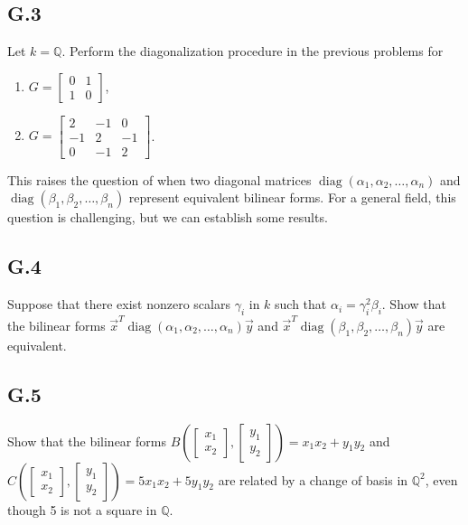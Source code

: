 \documentclass[lang=cn,11pt]{template}
\begin{document}
\subsection*{G.3} Let \( k = \mathbb{Q} \). Perform the diagonalization procedure in the previous problems for
\begin{enumerate}
    \item \( G = \begin{bmatrix} 0 & 1 \\ 1 & 0 \end{bmatrix} \),
    \item \( G = \begin{bmatrix} 2 & -1 & 0 \\ -1 & 2 & -1 \\ 0 & -1 & 2 \end{bmatrix} \).
\end{enumerate}

This raises the question of when two diagonal matrices \( \operatorname{diag}(\alpha_1, \alpha_2, \dots, \alpha_n) \) and \( \operatorname{diag}(\beta_1, \beta_2, \dots, \beta_n) \) represent equivalent bilinear forms. For a general field, this question is challenging, but we can establish some results.

\subsection*{G.4} Suppose that there exist nonzero scalars \( \gamma_i \) in \( k \) such that \( \alpha_i = \gamma_i^2 \beta_i \). Show that the bilinear forms \( \vec{x}^T \operatorname{diag}(\alpha_1, \alpha_2, \dots, \alpha_n) \vec{y} \) and \( \vec{x}^T \operatorname{diag}(\beta_1, \beta_2, \dots, \beta_n) \vec{y} \) are equivalent.

\subsection*{G.5} Show that the bilinear forms \( B\left(\begin{bmatrix} x_1 \\ x_2 \end{bmatrix}, \begin{bmatrix} y_1 \\ y_2 \end{bmatrix}\right) = x_1 x_2 + y_1 y_2 \) and \( C\left(\begin{bmatrix} x_1 \\ x_2 \end{bmatrix}, \begin{bmatrix} y_1 \\ y_2 \end{bmatrix}\right) = 5 x_1 x_2 + 5 y_1 y_2 \) are related by a change of basis in \( \mathbb{Q}^2 \), even though 5 is not a square in \( \mathbb{Q} \).
\end{document}
